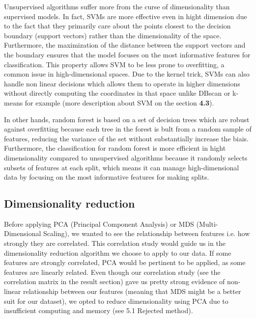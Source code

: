 \documentclass[twocolumn]{article}
\begin{document}
Unsupervised algorithms suffer more from the curse of dimensionality than supervised models. In fact, SVMs are more effective even in hight dimension due to the fact that they primarily care about the points closest to the decision boundary (support vectors) rather than the dimensionality of the space. Furthermore, the maximization of the distance between the support vectors and the boundary ensures that the model focuses on the most informative features for classification. This property allows SVM to be less prone to overfitting, a common issue in high-dimensional spaces. Due to the kernel trick, SVMs can also handle non linear decisions which allows them to operate in higher dimensions without directly computing the coordinates in that space unlike DBscan or k-means for example (more description about SVM on the section \textbf{4.3}).

In other hands, random forest is based on a set of decision trees which are robust against overfitting because each tree in the forest is bult from a random sample of features, reducing the variance of the set without substantially increase the biais. Furthermore, the classification for random forest is more efficient in hight dimensionality compared to unsupervised algorithms because it randomly selects subsets of features at each split, which means it can manage high-dimensional data by focusing on the most informative features for making splits.


\subsection{Dimensionality reduction}
Before applying PCA (Principal Component Analysis) or MDS (Multi-Dimensional Scaling), we wanted to see the relationship between features i.e. how strongly they are correlated. This correlation study would guide us in the dimensionality reduction algorithm we choose to apply to our data. If some features are strongly correlated, PCA would be pertinent to be applied, as some features are linearly related. Even though our correlation study (see the correlation matrix in the result section) gave us pretty strong evidence of non-linear relationship between our features (meaning that MDS might be a better suit for our dataset), we opted to reduce dimensionality using PCA due to insufficient computing and memory (see 5.1 Rejected method).
\end{document}
